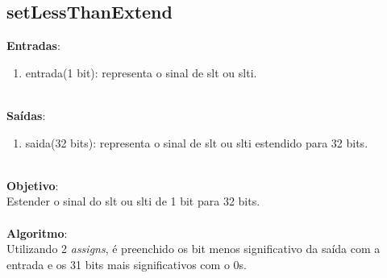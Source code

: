 \documentclass{article}
\begin{document}
    \subsection{setLessThanExtend}
    \textbf{Entradas}:
   \begin{enumerate}
        \item entrada(1 bit): representa o sinal de slt ou slti.\\
    \end{enumerate}
    \\
    \textbf{Saídas}:
    \begin{enumerate}
        \item saida(32 bits): representa o sinal de slt ou slti estendido para 32 bits.\\
    \end{enumerate}
    \\
    \textbf{Objetivo}:\\
    Estender o sinal do slt ou slti de 1 bit para 32 bits.
    \\
    \\
    \textbf{Algoritmo}:\\
    Utilizando 2 {\it assigns}, é preenchido os bit menos significativo da saída com a entrada e os 31 bits mais significativos com o 0s.
    
    \newpage
\end{document}
